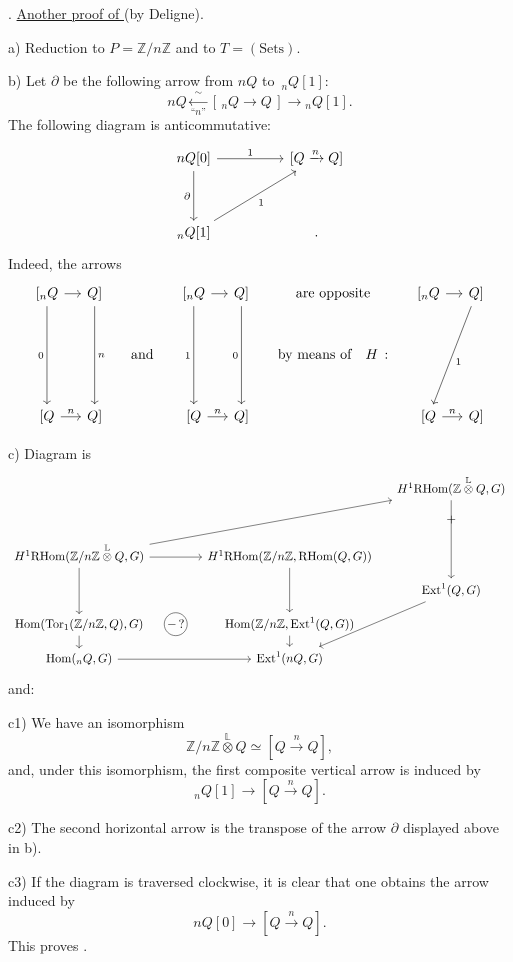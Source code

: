 
\medskip
\noindent {}.  \underline{Another proof of } (by
Deligne).

\medskip
\noindent a) Reduction to $P=\mathbb Z/n\mathbb Z$ and to
$T=(\mathrm{Sets})$.

\medskip
\noindent b) Let $\partial$ be the following arrow from $nQ$ to
$\,{}_nQ[1]$:
\[
 nQ\xleftarrow[\text{``$n$''}]{\ \sim\ }
 [\,{}_nQ\longrightarrow Q\,]
 \longrightarrow{}_nQ[1].
\]
The following diagram is anticommutative:
\[
\begin{tikzcd}[row sep=huge,column sep=huge]
 nQ[0]\arrow[r,"1"]\arrow[d,"\partial"']
   &{[Q\xrightarrow{n}Q]}\\
 {}_nQ[1]\arrow[ru,"1"']&{.}
\end{tikzcd}
\]
Indeed, the arrows
\[
\begin{tikzcd}[column sep=small,row sep=large]
 {[{}_nQ}\arrow[r]\arrow[dd,"0"']&{Q]}\arrow[dd,"n"]
   &&{[{}_nQ}\arrow[r]\arrow[dd,"1"']&{Q]}\arrow[dd,"0"']
   &\text{are opposite}
   &{[{}_nQ}\arrow[r]&{Q]}\arrow[ddl,"1"]\\
 &&\text{and}&&&\text{by means of}\quad H\,:&&\\
 {[Q}\arrow[r,"n"]&{Q]}&&{[Q}\arrow[r,"n"]&{Q]}
   &&{[Q}\arrow[r,"n"]&{Q]}
\end{tikzcd}
\]

\medskip
\noindent c) Diagram  is
\[
\begin{tikzcd}[column sep=small,row sep=small]
 &&&H^1\mathrm{RHom}
   (\mathbb Z\mathbin{\overset{\mathbb L}{\otimes}}Q,G)
   \arrow[ddd]\\
 &&&+\\
 H^1\mathrm{RHom}
   (\mathbb Z/n\mathbb Z\mathbin{\overset{\mathbb L}{\otimes}}Q,G)
   \arrow[rr]\arrow[dd]\arrow[uurrr]
 &&H^1\mathrm{RHom}
   (\mathbb Z/n\mathbb Z,\mathrm{RHom}(Q,G))
   \arrow[dd]&\\
 &&&\mathrm{Ext}^1(Q,G)\arrow[ddl]\\
 \mathrm{Hom}(\mathrm{Tor}_1(\mathbb Z/n\mathbb Z,Q),G)\arrow[d]
 &|[draw,circle,inner sep=1pt]|{-\,?}
 &\mathrm{Hom}(\mathbb Z/n\mathbb Z,\mathrm{Ext}^1(Q,G))
   \arrow[d]&\\
 \mathrm{Hom}({}_nQ,G)\arrow[rr]
 &&\mathrm{Ext}^1(nQ,G)&
\end{tikzcd}
\]
and:

\smallskip
\noindent c1) We have an isomorphism
\[
 \mathbb Z/n\mathbb Z
 \mathbin{\overset{\mathbb L}{\otimes}}Q
 \simeq[Q\xrightarrow{n}Q],
\]
and, under this isomorphism, the first composite vertical arrow is
induced by
\[
 {}_nQ[1]\longrightarrow[Q\xrightarrow{n}Q].
\]

\smallskip
\noindent c2) The second horizontal arrow is the transpose of the
arrow $\partial$ displayed above in b).

\smallskip
\noindent c3) If the diagram is traversed clockwise, it is clear that
one obtains the arrow induced by
\[
 nQ[0]\longrightarrow[Q\xrightarrow{n}Q].
\]
This proves .
